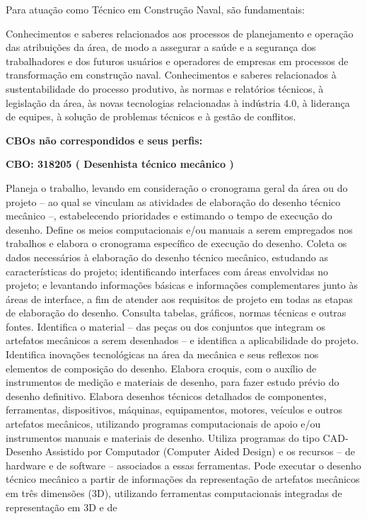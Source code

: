 \documentclass[
]{article}
\begin{document}
Para atuação como Técnico em Construção Naval, são fundamentais:

Conhecimentos e saberes relacionados aos processos de planejamento e
operação das atribuições da área, de modo a assegurar a saúde e a
segurança dos trabalhadores e dos futuros usuários e operadores de
empresas em processos de transformação em construção naval.
Conhecimentos e saberes relacionados à sustentabilidade do processo
produtivo, às normas e relatórios técnicos, à legislação da área, às
novas tecnologias relacionadas à indústria 4.0, à liderança de equipes,
à solução de problemas técnicos e à gestão de conflitos.

\textbf{CBOs não correspondidos e seus perfis:}

\textbf{CBO: 318205  ( Desenhista técnico mecânico )}

Planeja o trabalho, levando em consideração o cronograma geral da área
ou do projeto -- ao qual se vinculam as atividades de elaboração do
desenho técnico mecânico --, estabelecendo prioridades e estimando o
tempo de execução do desenho. Define os meios computacionais e/ou
manuais a serem empregados nos trabalhos e elabora o cronograma
específico de execução do desenho. Coleta os dados necessários à
elaboração do desenho técnico mecânico, estudando as características do
projeto; identificando interfaces com áreas envolvidas no projeto; e
levantando informações básicas e informações complementares junto às
áreas de interface, a fim de atender aos requisitos de projeto em todas
as etapas de elaboração do desenho. Consulta tabelas, gráficos, normas
técnicas e outras fontes. Identifica o material -- das peças ou dos
conjuntos que integram os artefatos mecânicos a serem desenhados -- e
identifica a aplicabilidade do projeto. Identifica inovações
tecnológicas na área da mecânica e seus reflexos nos elementos de
composição do desenho. Elabora croquis, com o auxílio de instrumentos de
medição e materiais de desenho, para fazer estudo prévio do desenho
definitivo. Elabora desenhos técnicos detalhados de componentes,
ferramentas, dispositivos, máquinas, equipamentos, motores, veículos e
outros artefatos mecânicos, utilizando programas computacionais de apoio
e/ou instrumentos manuais e materiais de desenho. Utiliza programas do
tipo CAD-Desenho Assistido por Computador (Computer Aided Design) e os
recursos -- de hardware e de software -- associados a essas ferramentas.
Pode executar o desenho técnico mecânico a partir de informações da
representação de artefatos mecânicos em três dimensões (3D), utilizando
ferramentas computacionais integradas de representação em 3D e de
\end{document}
